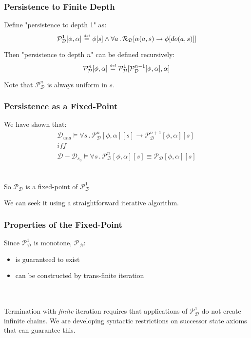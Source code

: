 \documentclass[compress]{beamer}
\newcommand{\isdef}{\hbox{$\stackrel{\mbox{\tiny def}}{=}$}}
\begin{document}
\begin{frame}
\frametitle{Persistence to Finite Depth}
Define "persistence to depth 1" as:
\begin{equation*}
  \mathcal{P}^1_{\mathcal{D}}[\phi,\alpha]\,\,\isdef\,\,\phi[s] \wedge \forall a\,.\,\mathcal{R}_{\mathcal{D}}[\alpha(a,s)\rightarrow \phi[do(a,s)]]
\end{equation*}

Then "persistence to depth $n$" can be defined recursively:
\begin{equation*}
  \mathcal{P}^n_{\mathcal{D}}[\phi,\alpha]\,\,\isdef\,\,\mathcal{P}^1_{\mathcal{D}}[\mathcal{P}^{n-1}_{\mathcal{D}}[\phi,\alpha],\alpha]
\end{equation*}

Note that $\mathcal{P}^{n}_{\mathcal{D}}$ is always uniform in $s$.
\end{frame}

\begin{frame}
\frametitle{Persistence as a Fixed-Point}
We have shown that:
\begin{gather*}
\mathcal{D}_{una}\models\forall s\,.\,\mathcal{P}_{\mathcal{D}}^{n}[\phi,\alpha][s]\rightarrow\mathcal{P}_{\mathcal{D}}^{n+1}[\phi,\alpha][s]\label{eqn:pn_persists}\\
\mathit{iff}\nonumber \\
\mathcal{D}-\mathcal{D}_{s_{0}}\models\forall s\,.\,\mathcal{P}_{\mathcal{D}}^{n}[\phi,\alpha][s]\equiv\mathcal{P_{D}}[\phi,\alpha][s]\label{eqn:pn_equiv_persists}
\end{gather*}
\ \\
\ \\
So $\mathcal{P}_{\mathcal{D}}$ is a fixed-point of $\mathcal{P}^1_{\mathcal{D}}$

We can seek it using a straightforward iterative algorithm.
\end{frame}

\begin{frame}
\frametitle{Properties of the Fixed-Point}
Since $\mathcal{P}^1_{\mathcal{D}}$ is monotone, $\mathcal{P}_{\mathcal{D}}$:
\begin{itemize}
  \item is guaranteed to exist
  \item can be constructed by trans-finite iteration
\end{itemize}
\ \\
\ \\
Termination with \emph{finite} iteration requires that applications of $\mathcal{P}^1_{\mathcal{D}}$ do not create infinite chains.  We are developing syntactic restrictions on successor state axioms that can guarantee this.
\end{frame}
\end{document}
